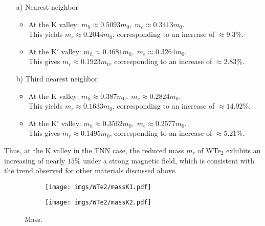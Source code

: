 \documentclass{article}
\begin{document}
\begin{itemize}
	\item[a)] Nearest neighbor
	      \begin{itemize}
		      \item At the K valley: $m_{h} \approx 0.5093 m_{0},\; m_{e} \approx 0.3413 m_{0}$. \\
		            This yields $m_{r} \approx 0.2044 m_{0}$, corresponding to an increase of $\approx 9.3\%$.

		      \item At the K$'$ valley: $m_{h} \approx 0.4681 m_{0},\; m_{e} \approx 0.3264 m_{0}$. \\
		            This gives $m_{r} \approx 0.1923 m_{0}$, corresponding to an increase of $\approx 2.83\%$.
	      \end{itemize}
	\item[b)] Third nearest neighbor
	      \begin{itemize}
		      \item At the K valley: $m_{h} \approx 0.387 m_{0},\; m_{e} \approx 0.2824 m_{0}$. \\
		            This yields $m_{r} \approx 0.1633 m_{0}$, corresponding to an increase of $\approx 14.92\%$.

		      \item At the K$'$ valley: $m_{h} \approx 0.3562 m_{0},\; m_{e} \approx 0.2577 m_{0}$. \\
		            This gives $m_{r} \approx 0.1495 m_{0}$, corresponding to an increase of $\approx 5.21\%$.
	      \end{itemize}
\end{itemize}

Thus, at the K valley in the TNN case, the reduced mass $m_r$ of WTe$_{2}$ exhibits an increasing of nearly $15\%$ under a strong magnetic field, which is consistent with the trend observed for other materials discussed above.

\begin{figure}[htb]
	\begin{subfigure}{0.495\textwidth}
		\centering
		\texttt{[image: imgs/WTe2/massK1.pdf]}
	\end{subfigure}
	\begin{subfigure}{0.495\textwidth}
		\centering
		\texttt{[image: imgs/WTe2/massK2.pdf]}
	\end{subfigure}
	\caption{Mass.}
\end{figure}

\newpage



\end{document}
